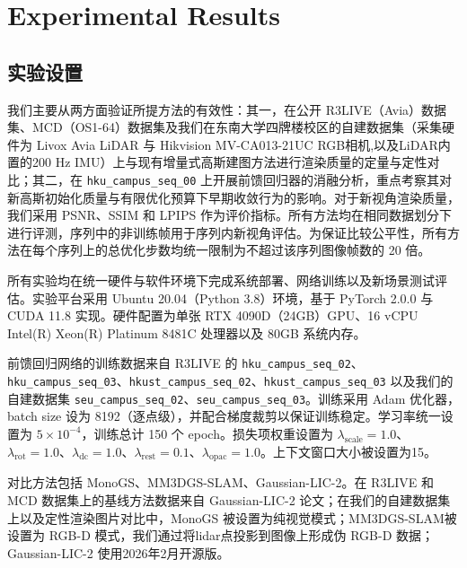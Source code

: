 
\section{Experimental Results}



\subsection{实验设置}
我们主要从两方面验证所提方法的有效性：其一，在公开 R3LIVE（Avia）数据集、MCD（OS1-64）数据集及我们在东南大学四牌楼校区的自建数据集（采集硬件为 Livox Avia LiDAR 与 Hikvision MV-CA013-21UC RGB相机,以及LiDAR内置的200 Hz IMU）上与现有增量式高斯建图方法进行渲染质量的定量与定性对比；其二，在 \texttt{hku\_campus\_seq\_00} 上开展前馈回归器的消融分析，重点考察其对新高斯初始化质量与有限优化预算下早期收敛行为的影响。对于新视角渲染质量，我们采用 PSNR、SSIM 和 LPIPS 作为评价指标。所有方法均在相同数据划分下进行评测，序列中的非训练帧用于序列内新视角评估。为保证比较公平性，所有方法在每个序列上的总优化步数均统一限制为不超过该序列图像帧数的 20 倍。

所有实验均在统一硬件与软件环境下完成系统部署、网络训练以及新场景测试评估。实验平台采用 Ubuntu 20.04（Python 3.8）环境，基于 PyTorch 2.0.0 与 CUDA 11.8 实现。硬件配置为单张 RTX 4090D（24GB）GPU、16 vCPU Intel(R) Xeon(R) Platinum 8481C 处理器以及 80GB 系统内存。

前馈回归网络的训练数据来自 R3LIVE 的 \texttt{hku\_campus\_seq\_02}、\texttt{hku\_campus\_seq\_03}、\texttt{hkust\_campus\_seq\_02}、\texttt{hkust\_campus\_seq\_03} 以及我们的自建数据集 \texttt{seu\_campus\_seq\_02}、\texttt{seu\_campus\_seq\_03}。训练采用 Adam 优化器，batch size 设为 8192（逐点级），并配合梯度裁剪以保证训练稳定。学习率统一设置为 $5\times10^{-4}$，训练总计 150 个 epoch。损失项权重设置为 $\lambda_{\text{scale}}=1.0$、$\lambda_{\text{rot}}=1.0$、$\lambda_{\text{dc}}=1.0$、$\lambda_{\text{rest}}=0.1$、$\lambda_{\text{opac}}=1.0$。上下文窗口大小被设置为15。

对比方法包括 MonoGS、MM3DGS-SLAM、Gaussian-LIC-2。在 R3LIVE 和 MCD 数据集上的基线方法数据来自 Gaussian-LIC-2 论文；在我们的自建数据集上以及定性渲染图片对比中，MonoGS 被设置为纯视觉模式；MM3DGS-SLAM被设置为 RGB-D 模式，我们通过将lidar点投影到图像上形成伪 RGB-D 数据；Gaussian-LIC-2 使用2026年2月开源版。

